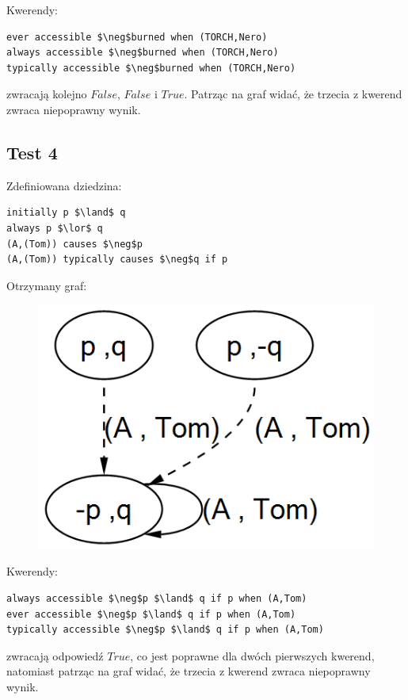 \documentclass{article}
\begin{document}
Kwerendy:
\begin{lstlisting}[mathescape=true]
ever accessible $\neg$burned when (TORCH,Nero)
always accessible $\neg$burned when (TORCH,Nero)
typically accessible $\neg$burned when (TORCH,Nero)
\end{lstlisting}
zwracają kolejno $False$, $False$ i $True$. Patrząc na graf widać, że trzecia z kwerend zwraca niepoprawny wynik.


\subsection{Test 4}
Zdefiniowana dziedzina:
\bigskip
{}
\begin{lstlisting}[mathescape=true]
initially p $\land$ q
always p $\lor$ q 
(A,(Tom)) causes $\neg$p
(A,(Tom)) typically causes $\neg$q if p
\end{lstlisting}
\vspace{1cm}

Otrzymany graf:
\begin{figure}[H]
	\centering
	\includegraphics[scale=0.6]{test4_graf}
\end{figure}

Kwerendy:
\begin{lstlisting}[mathescape=true]
always accessible $\neg$p $\land$ q if p when (A,Tom)
ever accessible $\neg$p $\land$ q if p when (A,Tom)
typically accessible $\neg$p $\land$ q if p when (A,Tom)
\end{lstlisting}
zwracają odpowiedź $True$, co jest poprawne dla dwóch pierwszych kwerend, natomiast patrząc na graf widać, że trzecia z kwerend zwraca niepoprawny wynik.

\newpage
\end{document}

